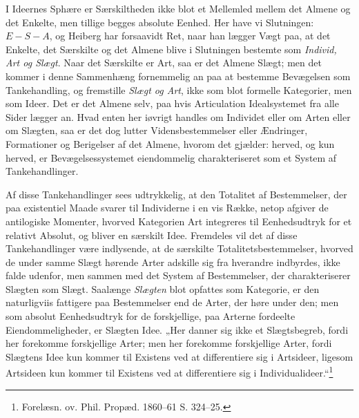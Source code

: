 \documentclass[11pt]{book}
\newcommand{\opage}[1]{\marginnote{\footnotesize\textit{[#1]}}}
\begin{document}
I Ideernes Sphære er Særskiltheden ikke blot et Mellemled mellem det
Almene og det Enkelte, men tillige begges absolute Eenhed. Her have vi
Slutningen: $E - S - A$, og Heiberg har forsaavidt Ret, naar han lægger
Vægt paa, at det Enkelte, det Særskilte og det Almene blive i Slutningen
bestemte som \emph{Individ, Art og Slægt}. Naar det Særskilte er Art, saa
er det Almene Slægt; men det kommer i denne Sammenhæng fornemmelig an paa
at bestemme Bevægelsen som Tankehandling, og fremstille \emph{Slægt og
Art}, ikke som blot formelle Kategorier, men som Ideer. Det er det Almene
selv, paa hvis Articulation Idealsystemet fra alle Sider lægger an. Hvad
enten her iøvrigt handles om Individet eller om Arten eller om Slægten,
saa er det dog lutter Vidensbestemmelser eller Ændringer, Formationer og
Berigelser af det Almene, hvorom det gjælder: herved, og kun herved, er
Bevægelsessystemet eiendommelig charakteriseret som et System af
Tankehandlinger.

Af disse Tankehandlinger sees udtrykkelig, at den Totalitet af
Bestemmelser, der paa existentiel Maade svarer til Individerne i en vis
Række, netop afgiver de antilogiske Momenter, hvorved Kategorien Art
integreres til Eenhedsudtryk for et relativt Absolut, og bliver en
særskilt Idee. Fremdeles vil det af disse Tankehandlinger være
indlysende, at de særskilte Totalitetsbestemmelser, hvorved de under
samme Slægt hørende Arter adskille sig fra hverandre indbyrdes, ikke
falde udenfor, men sammen med det System af Bestemmelser, der
charakteriserer Slægten som Slægt. Saalænge \emph{Slægten}
\opage{219} \setcounter{footnote}{0}%
blot opfattes som Kategorie, er den naturligviis fattigere paa
Bestemmelser end de Arter, der høre under den; men som absolut
Eenhedsudtryk for de forskjellige, paa Arterne fordeelte
Eiendommeligheder, er Slægten Idee. „Her danner sig ikke et
Slægtsbegreb, fordi her forekomme forskjellige Arter; men her forekomme
forskjellige Arter, fordi Slægtens Idee kun kommer til Existens ved at
differentiere sig i Artsideer, ligesom Artsideen kun kommer til Existens
ved at differentiere sig i
Individualideer.“\footnote{Forelæsn. ov. Phil. Propæd. 1860--61 S.
324--25.}
\end{document}
